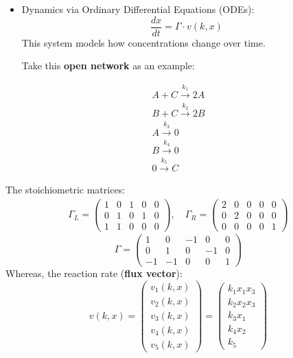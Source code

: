 \documentclass[aspectratio=169]{beamer}
\begin{document}
\begin{frame}
\begin{itemize}
	\item Dynamics via Ordinary Differential Equations (ODEs):
		$$ \frac{dx}{dt} = \Gamma \cdot v(k,x) $$
		This system models how concentrations change over time.

		Take this \textbf{open network} as an example:
\end{itemize}
\begin{align*}
	A + C \xrightarrow{k_{1}} 2A \\
	B + C \xrightarrow{k_{2}} 2B  \\
	A \xrightarrow{k_{3}} 0 \\
	B \xrightarrow{k_{4}} 0 \\
	0 \xrightarrow{k_{5}} C
\end{align*}
\end{frame}

\begin{frame}
The stoichiometric matrices:
\begin{align*}
	\Gamma_L =
	\begin{pmatrix}
		1 & 0 & 1 & 0 & 0 \\
		0 & 1 & 0 & 1 & 0 \\
		1 & 1 & 0 & 0 & 0
	\end{pmatrix}
	, \quad
	\Gamma_R =
	\begin{pmatrix}
		2 & 0 & 0 & 0 & 0 \\
		0 & 2 & 0 & 0 & 0 \\
		0 & 0 & 0 & 0 & 1
	\end{pmatrix}
\end{align*}
\begin{equation*}
	\Gamma =
	\begin{pmatrix*}
		1 & 0 & -1 & 0 & 0 \\
		0 & 1 & 0 & -1 & 0 \\
		-1 & -1 & 0 & 0 & 1
	\end{pmatrix*}
\end{equation*}
Whereas, the reaction rate (\textbf{flux vector}):
\[
	v(k,x) =
	\begin{pmatrix*}
		v_{1}(k,x)	 \\
		v_{2}(k,x)	 \\
		v_{3}(k,x)	 \\
		v_{4}(k,x)	 \\
		v_{5}(k,x)
	\end{pmatrix*} =
	\begin{pmatrix}
		k_1 x_1 x_3 \\
		k_2 x_2 x_3 \\
		k_3 x_1 \\
		k_4 x_2 \\
		k_5
	\end{pmatrix}
\]
\end{frame}
\end{document}
